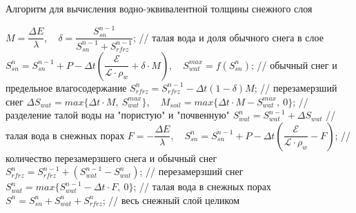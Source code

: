 \documentclass[unicode]{beamer}
\begin{document}
\begin{frame}{Алгоритм для вычисления водно-эквивалентной толщины снежного слоя}

\tiny

        \State $ M = \dfrac{\Delta E}{\lambda} $, ~ $ \delta = \dfrac{S_{sn}^{n-1}}{S_{sn}^{n-1} + S_{rfrz}^{n - 1}}$; // талая вода и доля обычного снега в слое
        \State $ S_{sn}^n = S_{sn}^{n-1} + P - \Delta t \left( \dfrac{\mathcal{E}}{\mathcal{L} \cdot \rho_w} + \delta \cdot M \right) $, ~  $ S_{wat}^{max} = f( S_{sn}^n ) $; // обычный снег и предельное влагосодержание
        \State $ S_{rfrz}^n = S_{rfrz}^{n - 1} - \Delta t (1 - \delta)M $; // перезамерзший снег
        \State $ \Delta S_{wat} = max\{\Delta t \cdot M, ~S_{wat}^{max}\} $, ~ $ M_{soil} = max\{\Delta t \cdot M - S_{wat}^{max}, ~0\} $; // разделение талой воды на "пористую" и "почвенную"
        \State $ S_{wat}^n = S_{wat}^{n-1} + \Delta S_{wat} $ // талая вода в снежных порах
    \Else
            \State $F = -\dfrac{\Delta E}{\lambda}$, ~ $S_{sn}^n = S_{sn}^{n-1} + P - \Delta t \left( \dfrac{\mathcal{E}}{\mathcal{L} \cdot \rho_w} - F \right)$; // количество перезамерзшего снега и обычный снег
            \State $S_{rfrz}^n = S_{rfrz}^{n - 1} + ( S_{wat}^{n-1} - S_{wat}^n )$; // перезамерзший снег
            \State $S_{wat}^n = max\{ S_{wat}^{n-1} - \Delta t \cdot F, ~0\}$; // талая вода в снежных порах
        \EndIf
    \EndIf
    \State $S^n = S_{sn}^n + S_{wat}^n + S_{rfrz}^n$; // весь снежный слой целиком

\end{frame}
\end{document}
